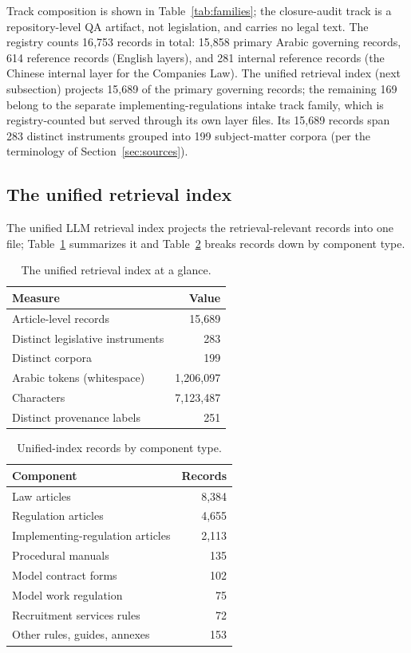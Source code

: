 \documentclass[11pt]{article}
\begin{document}
Track composition is shown in Table~\ref{tab:families}; the closure-audit
track is a repository-level QA artifact, not legislation, and carries no
legal text. The registry counts 16{,}753 records in total: 15{,}858 primary
Arabic governing records, 614 reference records (English layers), and 281
internal reference records (the Chinese internal layer for the Companies
Law). The unified retrieval index (next subsection) projects 15{,}689 of
the primary governing records; the remaining 169 belong to the separate
implementing-regulations intake track family, which is registry-counted but
served through its own layer files. Its 15{,}689 records span 283 distinct
instruments grouped into 199 subject-matter corpora (per the terminology of
Section~\ref{sec:sources}).

\subsection{The unified retrieval index}

The unified LLM retrieval index projects the retrieval-relevant records
into one file; Table~\ref{tab:index} summarizes it and
Table~\ref{tab:components} breaks records down by component type.

\begin{table}[t]
\centering
\small
\begin{tabular}{lr}
\toprule
\textbf{Measure} & \textbf{Value} \\
\midrule
Article-level records & 15{,}689 \\
Distinct legislative instruments & 283 \\
Distinct corpora & 199 \\
Arabic tokens (whitespace) & 1{,}206{,}097 \\
Characters & 7{,}123{,}487 \\
Distinct provenance labels & 251 \\
\bottomrule
\end{tabular}
\caption{The unified retrieval index at a glance.}
\label{tab:index}
\end{table}

\begin{table}[t]
\centering
\small
\begin{tabular}{lr}
\toprule
\textbf{Component} & \textbf{Records} \\
\midrule
Law articles & 8{,}384 \\
Regulation articles & 4{,}655 \\
Implementing-regulation articles & 2{,}113 \\
Procedural manuals & 135 \\
Model contract forms & 102 \\
Model work regulation & 75 \\
Recruitment services rules & 72 \\
Other rules, guides, annexes & 153 \\
\bottomrule
\end{tabular}
\caption{Unified-index records by component type.}
\label{tab:components}
\end{table}
\end{document}
